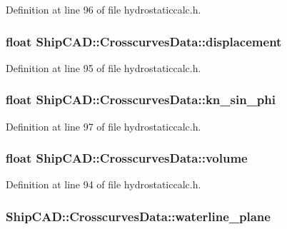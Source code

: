 Definition at line 96 of file hydrostaticcalc.\-h.

\hypertarget{structShipCAD_1_1CrosscurvesData_a9a7baa66159e203888390eaa63caf708}{
\subsubsection[{displacement}]{\setlength{\rightskip}{0pt plus 5cm}float Ship\-C\-A\-D\-::\-Crosscurves\-Data\-::displacement}}\label{structShipCAD_1_1CrosscurvesData_a9a7baa66159e203888390eaa63caf708}


Definition at line 95 of file hydrostaticcalc.\-h.

\hypertarget{structShipCAD_1_1CrosscurvesData_a55150860fed821e314e18b72f1975749}{
\subsubsection[{kn\-\_\-sin\-\_\-phi}]{\setlength{\rightskip}{0pt plus 5cm}float Ship\-C\-A\-D\-::\-Crosscurves\-Data\-::kn\-\_\-sin\-\_\-phi}}\label{structShipCAD_1_1CrosscurvesData_a55150860fed821e314e18b72f1975749}


Definition at line 97 of file hydrostaticcalc.\-h.

\hypertarget{structShipCAD_1_1CrosscurvesData_a9bec38a77bf87ab5feb76899e39e4f7b}{
\subsubsection[{volume}]{\setlength{\rightskip}{0pt plus 5cm}float Ship\-C\-A\-D\-::\-Crosscurves\-Data\-::volume}}\label{structShipCAD_1_1CrosscurvesData_a9bec38a77bf87ab5feb76899e39e4f7b}


Definition at line 94 of file hydrostaticcalc.\-h.

\hypertarget{structShipCAD_1_1CrosscurvesData_a1ea6de1b52289e8392e8d499ae4aad04}{
\subsubsection[{waterline\-\_\-plane}]{ Ship\-C\-A\-D\-::\-Crosscurves\-Data\-::waterline\-\_\-plane}}\label{structShipCAD_1_1CrosscurvesData_a1ea6de1b52289e8392e8d499ae4aad04}


